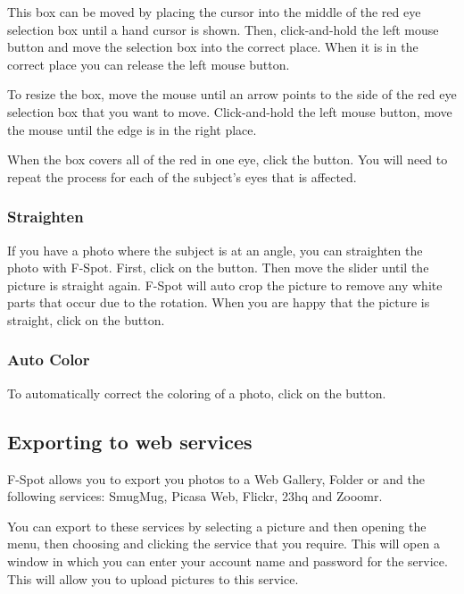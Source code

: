 This box can be moved by placing the cursor into the middle of the red eye 
selection box until a hand cursor is shown. Then, click-and-hold the left mouse 
button and move the selection box into the correct place. When it is in the 
correct place you can release the left mouse button.

To resize the box, move the mouse until an arrow points to the side of the 
red eye selection box that you want to move. Click-and-hold the left mouse 
button, move the mouse until the edge is in the right place.

When the box covers all of the red in one eye, click the  button. 
You will need to repeat the process for each of the subject's eyes that is 
affected.

\subsubsection{Straighten}

If you have a photo where the subject is at an angle, you can straighten the
photo with F-Spot. First, click on the  button. Then move the 
slider until the picture is straight again. F-Spot will auto crop the picture 
to remove any white parts that occur due to the rotation. When you are happy 
that the picture is straight, click on the  button.

\subsubsection{Auto Color}

To automatically correct the coloring of a photo, click on the 
 button.

\subsection{Exporting to web services}

F-Spot allows you to export you photos to a Web Gallery, Folder or  and the 
following services: SmugMug, Picasa Web, Flickr, 23hq and Zooomr.

You can export to these services by selecting a picture and then opening the
 menu, then choosing  and clicking the service that 
you require. This will open a window in which you can enter your account name and 
password for the service. This will allow you to upload pictures to this service.
